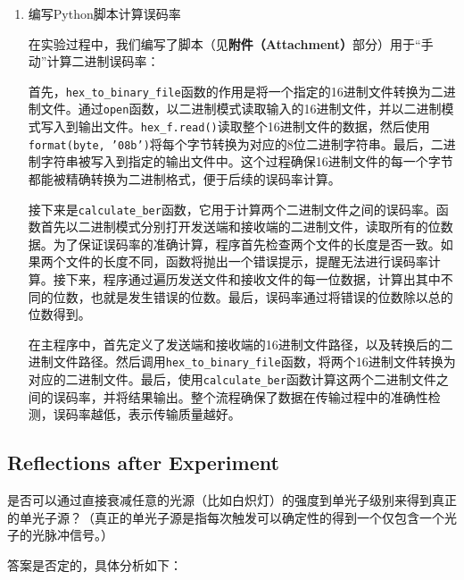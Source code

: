 \begin{enumerate}
	\item 编写Python脚本计算误码率
	
	在实验过程中，我们编写了脚本（见\textbf{附件（Attachment）}部分）用于“手动”计算二进制误码率：
	
	首先，\texttt{hex\_to\_binary\_file}函数的作用是将一个指定的16进制文件转换为二进制文件。通过\texttt{open}函数，以二进制模式读取输入的16进制文件，并以二进制模式写入到输出文件。\texttt{hex\_f.read()}读取整个16进制文件的数据，然后使用\texttt{format(byte, '08b')}将每个字节转换为对应的8位二进制字符串。最后，二进制字符串被写入到指定的输出文件中。这个过程确保16进制文件的每一个字节都能被精确转换为二进制格式，便于后续的误码率计算。
	
	接下来是\texttt{calculate\_ber}函数，它用于计算两个二进制文件之间的误码率。函数首先以二进制模式分别打开发送端和接收端的二进制文件，读取所有的位数据。为了保证误码率的准确计算，程序首先检查两个文件的长度是否一致。如果两个文件的长度不同，函数将抛出一个错误提示，提醒无法进行误码率计算。接下来，程序通过遍历发送文件和接收文件的每一位数据，计算出其中不同的位数，也就是发生错误的位数。最后，误码率通过将错误的位数除以总的位数得到。
	
	在主程序中，首先定义了发送端和接收端的16进制文件路径，以及转换后的二进制文件路径。然后调用\texttt{hex\_to\_binary\_file}函数，将两个16进制文件转换为对应的二进制文件。最后，使用\texttt{calculate\_ber}函数计算这两个二进制文件之间的误码率，并将结果输出。整个流程确保了数据在传输过程中的准确性检测，误码率越低，表示传输质量越好。
\end{enumerate}



\subsection{Reflections after Experiment}

\begin{question}
	是否可以通过直接衰减任意的光源（比如白炽灯）的强度到单光子级别来得到真正的单光子源？（真正的单光子源是指每次触发可以确定性的得到一个仅包含一个光子的光脉冲信号。）
\end{question}
答案是否定的，具体分析如下：


